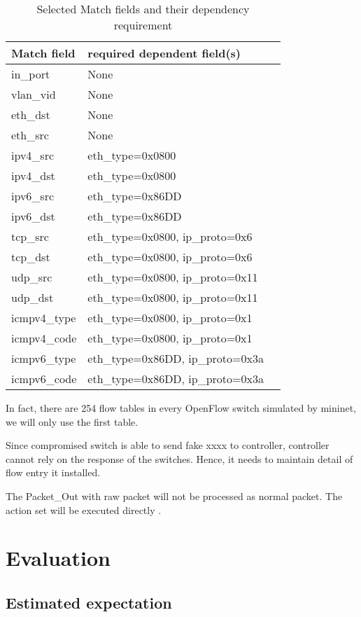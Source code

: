 \begin{table}[H]
\centering
\caption{Selected Match fields and their dependency requirement}
\begin{tabular}{|l|p{4cm}|p{8cm}}
\hline Match field & required dependent field(s) \\
\hline in\_port & None \\
\hline vlan\_vid & None \\
\hline eth\_dst & None \\
\hline eth\_src & None \\
\hline ipv4\_src & eth\_type=0x0800 \\
\hline ipv4\_dst & eth\_type=0x0800 \\
\hline ipv6\_src & eth\_type=0x86DD \\ 
\hline ipv6\_dst & eth\_type=0x86DD \\
\hline tcp\_src & eth\_type=0x0800, ip\_proto=0x6 \\
\hline tcp\_dst & eth\_type=0x0800, ip\_proto=0x6 \\
\hline udp\_src & eth\_type=0x0800, ip\_proto=0x11 \\
\hline udp\_dst & eth\_type=0x0800, ip\_proto=0x11 \\
\hline icmpv4\_type & eth\_type=0x0800, ip\_proto=0x1 \\
\hline icmpv4\_code & eth\_type=0x0800, ip\_proto=0x1 \\
\hline icmpv6\_type & eth\_type=0x86DD, ip\_proto=0x3a \\
\hline icmpv6\_code & eth\_type=0x86DD, ip\_proto=0x3a \\
\hline 
\end{tabular}
\label{table:selected_match_fields}
\end{table}

In fact, there are 254 flow tables in every OpenFlow switch simulated by mininet, we will only use the first table.

Since compromised switch is able to send fake xxxx to controller, controller cannot rely on the response of the switches. Hence, it needs to maintain detail of flow entry it installed. 


The Packet\_Out with raw packet will not be processed as normal packet. The action set will be executed directly \cite{PACKETOUT}.


\section{Evaluation}

\subsection{Estimated expectation}
